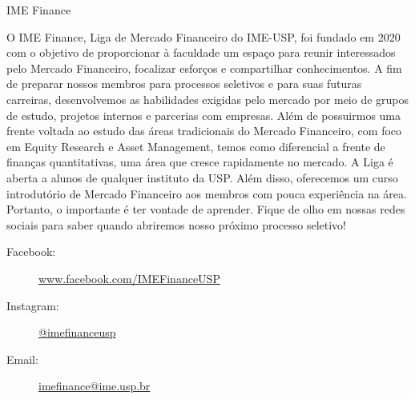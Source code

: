 \begin{subsecao}{IME Finance}

	

O IME Finance, Liga de Mercado Financeiro do IME-USP, foi fundado em 2020 com o 
objetivo de proporcionar à faculdade um espaço para reunir interessados pelo 
Mercado Financeiro, focalizar esforços e compartilhar conhecimentos.
A fim de preparar nossos membros para processos seletivos e para suas futuras 
carreiras, desenvolvemos as habilidades exigidas pelo mercado por meio de grupos de 
estudo, projetos internos e parcerias com empresas. Além de possuirmos uma frente 
voltada ao estudo das áreas tradicionais do Mercado Financeiro, com foco em Equity
Research e Asset Management, temos como diferencial a frente de finanças quantitativas, 
uma área que cresce rapidamente no mercado. A Liga é aberta a alunos de qualquer 
instituto da USP. Além disso, oferecemos um curso introdutório de Mercado Financeiro 
aos membros com pouca experiência na área. Portanto, o importante é ter vontade de 
aprender. Fique de olho em nossas redes sociais para saber quando abriremos nosso 
próximo processo seletivo!

\begin{description}
  \item[Facebook:] \url{www.facebook.com/IMEFinanceUSP}
  \item[Instagram:] \url{@imefinanceusp}
  \item[Email:] \url{imefinance@ime.usp.br}
\end{description}

\end{subsecao}

